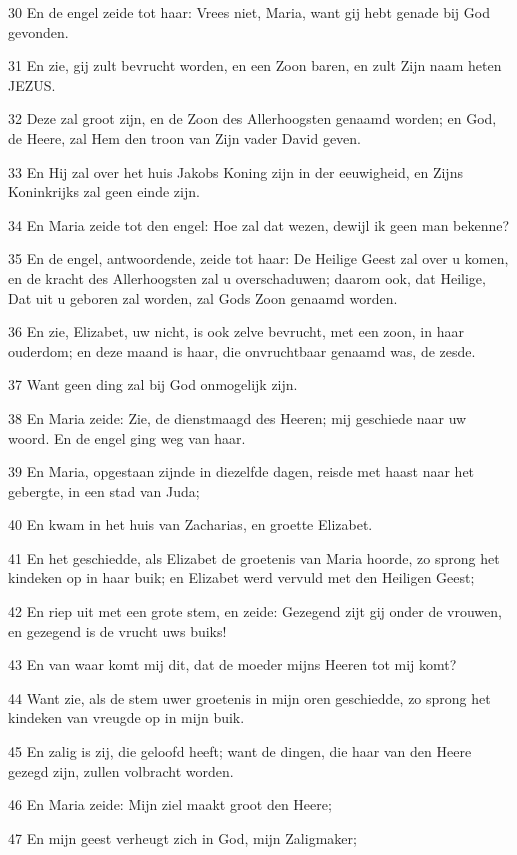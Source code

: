 \par 30 En de engel zeide tot haar: Vrees niet, Maria, want gij hebt genade bij God gevonden.
\par 31 En zie, gij zult bevrucht worden, en een Zoon baren, en zult Zijn naam heten JEZUS.
\par 32 Deze zal groot zijn, en de Zoon des Allerhoogsten genaamd worden; en God, de Heere, zal Hem den troon van Zijn vader David geven.
\par 33 En Hij zal over het huis Jakobs Koning zijn in der eeuwigheid, en Zijns Koninkrijks zal geen einde zijn.
\par 34 En Maria zeide tot den engel: Hoe zal dat wezen, dewijl ik geen man bekenne?
\par 35 En de engel, antwoordende, zeide tot haar: De Heilige Geest zal over u komen, en de kracht des Allerhoogsten zal u overschaduwen; daarom ook, dat Heilige, Dat uit u geboren zal worden, zal Gods Zoon genaamd worden.
\par 36 En zie, Elizabet, uw nicht, is ook zelve bevrucht, met een zoon, in haar ouderdom; en deze maand is haar, die onvruchtbaar genaamd was, de zesde.
\par 37 Want geen ding zal bij God onmogelijk zijn.
\par 38 En Maria zeide: Zie, de dienstmaagd des Heeren; mij geschiede naar uw woord. En de engel ging weg van haar.
\par 39 En Maria, opgestaan zijnde in diezelfde dagen, reisde met haast naar het gebergte, in een stad van Juda;
\par 40 En kwam in het huis van Zacharias, en groette Elizabet.
\par 41 En het geschiedde, als Elizabet de groetenis van Maria hoorde, zo sprong het kindeken op in haar buik; en Elizabet werd vervuld met den Heiligen Geest;
\par 42 En riep uit met een grote stem, en zeide: Gezegend zijt gij onder de vrouwen, en gezegend is de vrucht uws buiks!
\par 43 En van waar komt mij dit, dat de moeder mijns Heeren tot mij komt?
\par 44 Want zie, als de stem uwer groetenis in mijn oren geschiedde, zo sprong het kindeken van vreugde op in mijn buik.
\par 45 En zalig is zij, die geloofd heeft; want de dingen, die haar van den Heere gezegd zijn, zullen volbracht worden.
\par 46 En Maria zeide: Mijn ziel maakt groot den Heere;
\par 47 En mijn geest verheugt zich in God, mijn Zaligmaker;
